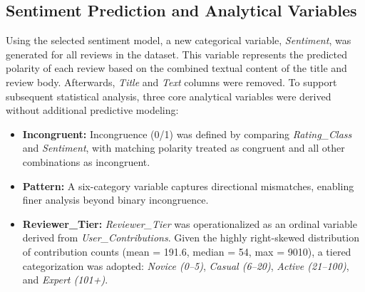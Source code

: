 \documentclass[conference]{IEEEtran}
\begin{document}
\begin{table}[t]
\caption{Sentiment Model Performance on Test Set ($n=300$)}
\label{tab:sentiment_model_performance}
\centering
{}
\end{table}

\subsection{Sentiment Prediction and Analytical Variables}
Using the selected sentiment model, a new categorical variable, \textit{Sentiment}, was generated for all reviews in the dataset. This variable represents the predicted polarity of each review based on the combined textual content of the title and review body. Afterwards, \textit{Title} and \textit{Text} columns were removed. To support subsequent statistical analysis, three core analytical variables were derived without additional predictive modeling:

\begin{itemize}
\item \textbf{Incongruent:} Incongruence (0/1) was defined by comparing \textit{Rating\_Class} and \textit{Sentiment}, with matching polarity treated as congruent and all other combinations as incongruent.
\item \textbf{Pattern:} A six-category variable captures directional mismatches, enabling finer analysis beyond binary incongruence.
\item \textbf{Reviewer\_Tier:} \textit{Reviewer\_Tier} was operationalized as an ordinal variable derived from \textit{User\_Contributions}. Given the highly right-skewed distribution of contribution counts (mean = 191.6, median = 54, max = 9010), a tiered categorization was adopted: \textit{Novice (0--5)}, \textit{Casual (6--20)}, \textit{Active (21--100)}, and \textit{Expert (101+)}.
\end{itemize}
\end{document}
